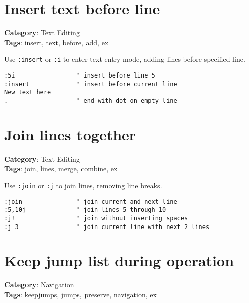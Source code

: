 {{{{{\section{Insert text before line}

\textbf{Category}: Text Editing\\ \textbf{Tags}: insert, text, before, add, ex
\vspace{0.5cm}

Use {\footnotesize \Verb§:insert§} or {\footnotesize \Verb§:i§} to enter text entry mode, adding lines before specified line.

\begin{Exa*}{}
\begin{Verbatim}[fontsize=\footnotesize, breaklines, breakanywhere]
:5i                 " insert before line 5
:insert             " insert before current line
New text here
.                   " end with dot on empty line
\end{Verbatim}
\end{Exa*}

\section{Join lines together}

\textbf{Category}: Text Editing\\ \textbf{Tags}: join, lines, merge, combine, ex
\vspace{0.5cm}

Use {\footnotesize \Verb§:join§} or {\footnotesize \Verb§:j§} to join lines, removing line breaks.

\begin{Exa*}{}
\begin{Verbatim}[fontsize=\footnotesize, breaklines, breakanywhere]
:join               " join current and next line
:5,10j              " join lines 5 through 10
:j!                 " join without inserting spaces
:j 3                " join current line with next 2 lines
\end{Verbatim}
\end{Exa*}

\section{Keep jump list during operation}

\textbf{Category}: Navigation\\ \textbf{Tags}: keepjumps, jumps, preserve, navigation, ex
\vspace{0.5cm}

}}}}}
